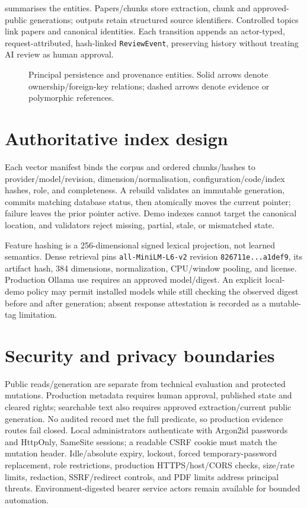  summarises the entities. Papers/chunks store extraction, chunk and approved-public generations; outputs retain structured source identifiers. Controlled topics link papers and canonical identities. Each transition appends an actor-typed, request-attributed, hash-linked \texttt{ReviewEvent}, preserving history without treating AI review as human approval.

\begin{figure}[htbp]
\centering
\resizebox{0.97\textwidth}{!}{}
\caption[Principal persistence and provenance entities.]{Principal persistence and provenance entities. Solid arrows denote ownership/foreign-key relations; dashed arrows denote evidence or polymorphic references.}
\label{fig:entity-model}
\end{figure}

\section{Authoritative index design}

Each vector manifest binds the corpus and ordered chunks/hashes to provider/model/revision, dimension/normalisation, configuration/code/index hashes, role, and completeness. A rebuild validates an immutable generation, commits matching database status, then atomically moves the current pointer; failure leaves the prior pointer active. Demo indexes cannot target the canonical location, and validators reject missing, partial, stale, or mismatched state.

Feature hashing is a 256-dimensional signed lexical projection, not learned semantics. Dense retrieval pins \texttt{all-MiniLM-L6-v2} revision \texttt{826711e...a1def9}, its artifact hash, 384 dimensions, normalization, CPU/window pooling, and license. Production Ollama use requires an approved model/digest. An explicit local-demo policy may permit installed models while still checking the observed digest before and after generation; absent response attestation is recorded as a mutable-tag limitation.

\section{Security and privacy boundaries}

Public reads/generation are separate from technical evaluation and protected mutations. Production metadata requires human approval, published state and cleared rights; searchable text also requires approved extraction/current public generation. No audited record met the full predicate, so production evidence routes fail closed. Local administrators authenticate with Argon2id passwords and HttpOnly, SameSite sessions; a readable CSRF cookie must match the mutation header. Idle/absolute expiry, lockout, forced temporary-password replacement, role restrictions, production HTTPS/host/CORS checks, size/rate limits, redaction, SSRF/redirect controls, and PDF limits address principal threats. Environment-digested bearer service actors remain available for bounded automation.

